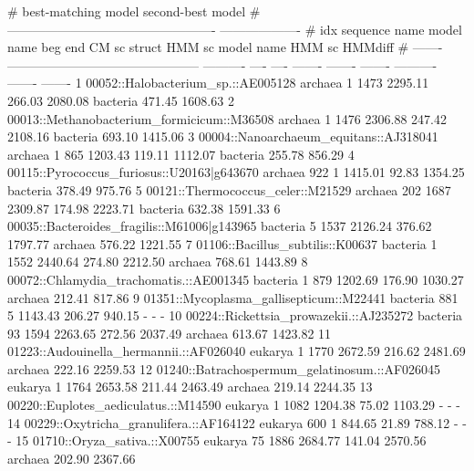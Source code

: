 \begin{sreoutputtinywide}
#                                                                        best-matching model                  second-best model 
#                                                         -------------------------------------------------  -------------------
#     idx  sequence name                                  model name   beg   end    CM sc   struct   HMM sc  model name   HMM sc  HMMdiff
# -------  ---------------------------------------------  ----------  ----  ----  -------  -------  -------  ----------  -------  -------
        1  00052::Halobacterium_sp.::AE005128             archaea        1  1473  2295.11   266.03  2080.08  bacteria     471.45  1608.63
        2  00013::Methanobacterium_formicicum::M36508     archaea        1  1476  2306.88   247.42  2108.16  bacteria     693.10  1415.06
        3  00004::Nanoarchaeum_equitans::AJ318041         archaea        1   865  1203.43   119.11  1112.07  bacteria     255.78   856.29
        4  00115::Pyrococcus_furiosus::U20163|g643670     archaea      922     1  1415.01    92.83  1354.25  bacteria     378.49   975.76
        5  00121::Thermococcus_celer::M21529              archaea      202  1687  2309.87   174.98  2223.71  bacteria     632.38  1591.33
        6  00035::Bacteroides_fragilis::M61006|g143965    bacteria       5  1537  2126.24   376.62  1797.77  archaea      576.22  1221.55
        7  01106::Bacillus_subtilis::K00637               bacteria       1  1552  2440.64   274.80  2212.50  archaea      768.61  1443.89
        8  00072::Chlamydia_trachomatis.::AE001345        bacteria       1   879  1202.69   176.90  1030.27  archaea      212.41   817.86
        9  01351::Mycoplasma_gallisepticum::M22441        bacteria     881     5  1143.43   206.27   940.15  -                 -        -
       10  00224::Rickettsia_prowazekii.::AJ235272        bacteria      93  1594  2263.65   272.56  2037.49  archaea      613.67  1423.82
       11  01223::Audouinella_hermannii.::AF026040        eukarya        1  1770  2672.59   216.62  2481.69  archaea      222.16  2259.53
       12  01240::Batrachospermum_gelatinosum.::AF026045  eukarya        1  1764  2653.58   211.44  2463.49  archaea      219.14  2244.35
       13  00220::Euplotes_aediculatus.::M14590           eukarya        1  1082  1204.38    75.02  1103.29  -                 -        -
       14  00229::Oxytricha_granulifera.::AF164122        eukarya      600     1   844.65    21.89   788.12  -                 -        -
       15  01710::Oryza_sativa.::X00755                   eukarya       75  1886  2684.77   141.04  2570.56  archaea      202.90  2367.66
\end{sreoutputtinywide}

